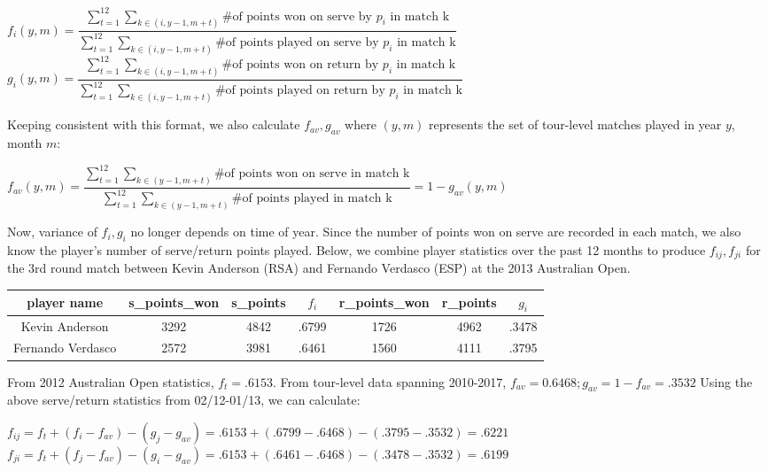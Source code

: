 \documentclass[chapterprefix=false]{report}
\begin{document}
\begin{center}
$f_i(y,m) = \dfrac{\sum_{t=1}^{12}\sum_{k \in (i,y-1,m+t)}{\text{\# of points won on serve by $p_i$ in match k}}}{\sum_{t=1}^{12}\sum_{k \in (i,y-1,m+t)}\text{\# of points played on serve by $p_i$ in match k}}$
$g_i(y,m) = \dfrac{\sum_{t=1}^{12}\sum_{k \in (i,y-1,m+t)}{\text{\# of points won on return by $p_i$ in match k}}}{\sum_{t=1}^{12}\sum_{k \in (i,y-1,m+t)}\text{\# of points played on return by $p_i$ in match k}}$
\end{center}

Keeping consistent with this format, we also calculate $f_{av},g_{av}$ where $(y,m)$ represents the set of tour-level matches played in year $y$, month $m$:

\begin{center}
$f_{av}(y,m) = \dfrac{\sum_{t=1}^{12}\sum_{k \in (y-1,m+t)}{\text{\# of points won on serve in match k}}}{\sum_{t=1}^{12}\sum_{k \in (y-1,m+t)}\text{\# of points played in match k}} = 1 - g_{av}(y,m)$
\end{center}

Now, variance of $f_i,g_i$ no longer depends on time of year. Since the number of points won on serve are recorded in each match, we also know the player's number of serve/return points played. Below, we combine player statistics over the past 12 months to produce $f_{ij},f_{ji}$ for the 3rd round match between Kevin Anderson (RSA) and Fernando Verdasco (ESP) at the 2013 Australian Open.

\begin{center}
\begin{tabular}{ |c|c|c|c|c|c|c| } 
 \hline
 player name & s\_points\_won & s\_points
&$f_i$ & r\_points\_won & r\_points & $g_i$ \\ 
 \hline
 Kevin Anderson & 3292 & 4842 & .6799 & 1726 & 4962 & .3478\\ 
 \hline
 Fernando Verdasco & 2572 & 3981 & .6461 & 1560 & 4111 & .3795\\ 
 \hline
\end{tabular}
\end{center}

From 2012 Australian Open statistics, $f_t=.6153$. From tour-level data spanning 2010-2017, $f_{av} = 0.6468; g_{av} = 1-f_{av} =.3532$ Using the above serve/return statistics from 02/12-01/13, we can calculate:

\begin{center}
$f_{ij} = f_t + (f_i-f_{av})-(g_j-g_{av}) = .6153 + (.6799-.6468) - (.3795-.3532) = .6221$
$f_{ji} = f_t + (f_j-f_{av})-(g_i-g_{av}) = .6153 + (.6461-.6468) - (.3478-.3532) = .6199$
\end{center}
\end{document}
